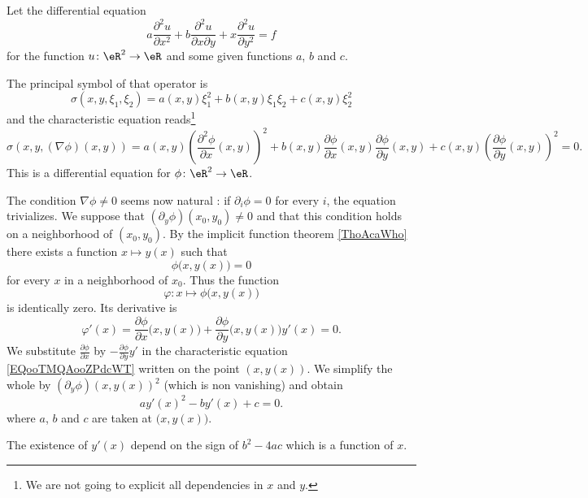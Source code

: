 \begin{example}
    Let the differential equation
    \begin{equation}
        a\frac{ \partial^2u }{ \partial x^2 }+b\frac{ \partial^2u }{ \partial x\partial y }+x\frac{ \partial^2u }{ \partial y^2 }=f
    \end{equation}
    for the function \( u\colon \eR^2\to \eR\) and some given functions \( a\), \( b\) and \( c\).

    The principal symbol of that operator is
    \begin{equation}
        \sigma(x,y,\xi_1,\xi_2)=a(x,y)\xi_1^2+b(x,y)\xi_1\xi_2+c(x,y)\xi_2^2
    \end{equation}
    and the characteristic equation reads\footnote{We are not going to explicit all dependencies in \( x\) and \( y\).}
    \begin{equation}        \label{EQooTMQAooZPdcWT}
        \sigma(x,y,  (\nabla\phi)(x,y)   )=a(x,y)\left( \frac{ \partial^2\phi }{ \partial x }(x,y) \right)^2+b(x,y)\frac{ \partial \phi }{ \partial x }(x,y)\frac{ \partial \phi }{ \partial y }(x,y)+c(x,y)\left( \frac{ \partial \phi }{ \partial y }(x,y) \right)^2=0.
    \end{equation}
    This is a differential equation for \( \phi\colon \eR^2\to \eR\).

    The condition \( \nabla\phi\neq 0\) seems now natural : if \( \partial_i\phi=0\) for every \( i\), the equation trivializes. We suppose that \( (\partial_y\phi)(x_0,y_0)\neq 0\) and that this condition holds on a neighborhood of \( (x_0,y_0)\). By the implicit function theorem \ref{ThoAcaWho} there exists a function \( x\mapsto y(x)\) such that
    \begin{equation}
        \phi\big( x,y(x) \big)=0
    \end{equation}
    for every \( x\) in a neighborhood of \( x_0\). Thus the function
    \begin{equation}
        \varphi\colon x\mapsto \phi\big( x,y(x) \big)
    \end{equation}
    is identically zero. Its derivative is
    \begin{equation}
        \varphi'(x)=\frac{ \partial \phi }{ \partial x }\big( x,y(x) \big)+\frac{ \partial \phi }{ \partial y }\big( x,y(x) \big)y'(x)=0.
    \end{equation}
    We substitute \( \frac{ \partial \phi }{ \partial x }\) by \( -\frac{ \partial \phi }{ \partial y }y'\) in the characteristic equation \eqref{EQooTMQAooZPdcWT} written on the point \( (x,y(x))\).  We simplify the whole by \( (\partial_y\phi)(x,y(x))^2\) (which is non vanishing) and obtain
    \begin{equation}
        ay'(x)^2-by'(x)+c=0.
    \end{equation}
    where \( a\), \( b\) and \( c\) are taken at \( \big( x,y(x) \big)\).

    The existence of \( y'(x)\) depend on the sign of \( b^2-4ac\) which is a function of \( x\).

\end{example}

